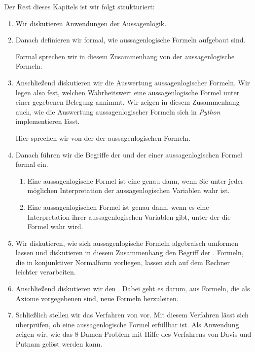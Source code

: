 Der Rest dieses Kapitels ist wir folgt strukturiert:
\begin{enumerate}
\item Wir diskutieren Anwendungen der Aussagenlogik.
\item Danach definieren wir formal, wie aussagenlogische Formeln aufgebaut sind.
  
      Formal sprechen wir in diesem Zusammenhang von der  aussagenlogische Formeln.
\item Anschließend diskutieren wir die Auswertung aussagenlogischer Formeln.
      Wir legen also fest, welchen Wahrheitswert eine aussagenlogische Formel unter einer gegebenen Belegung
      annimmt.  Wir zeigen in diesem Zusammenhang auch, wie die Auswertung aussagenlogischer Formeln sich in
      \textsl{Python}  implementieren lässt.

      Hier sprechen wir von der  der aussagenlogischen Formeln.
\item Danach führen wir die Begriffe der  und der  einer aussagenlogischen
      Formel formal ein.
      \begin{enumerate}
      \item Eine aussagenlogische Formel ist eine  genau dann, wenn Sie unter jeder möglichen
            Interpretation der aussagenlogischen Variablen wahr ist.
      \item Eine aussagenlogischen Formel ist  genau dann, wenn es eine Interpretation ihrer
            aussagenlogischen Variablen gibt, unter der die Formel wahr wird.
      \end{enumerate}
\item Wir diskutieren, wie sich aussagenlogische Formeln algebraisch umformen lassen und diskutieren
      in diesem Zusammenhang den Begriff der .  Formeln, die in konjunktiver
      Normalform vorliegen, lassen sich auf dem Rechner leichter verarbeiten.
\item Anschließend diskutieren wir den .  Dabei geht es darum, aus Formeln,
      die als Axiome vorgegebenen sind, neue Formeln herzuleiten.
\item Schließlich stellen wir das Verfahren von  vor.  Mit diesem Verfahren lässt sich
      überprüfen, ob eine aussagenlogische Formel erfüllbar ist.  Als Anwendung zeigen wir, wie das
      8-Damen-Problem mit Hilfe des Verfahrens von Davis und Putnam gelöst werden kann.
\end{enumerate}

